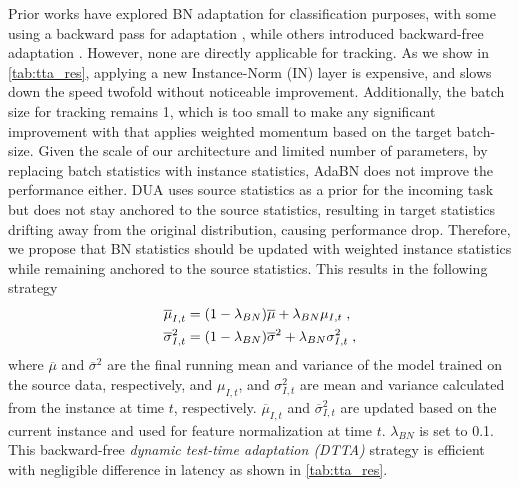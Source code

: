 Prior works have explored BN adaptation for classification purposes, with some using a backward pass for adaptation \cite{niu2022efficient, wang2020tent}, while others introduced backward-free adaptation \cite{pan2018two, schneider2020improving, mirza2022norm, li2016revisiting}. However, none are directly applicable for tracking. As we show in \ref{tab:tta_res}, applying a new Instance-Norm (IN) layer \cite{pan2018two} is expensive, and slows down the speed twofold without noticeable improvement. Additionally, the batch size for tracking remains 1, which is too small to make any significant improvement with \cite{schneider2020improving} that applies weighted momentum based on the target batch-size. Given the scale of our architecture and limited number of parameters, by replacing batch statistics with instance statistics, AdaBN \cite{li2016revisiting} does not improve the performance either. DUA \cite{mirza2022norm} uses source statistics as a prior for the incoming task but does not stay anchored to the source statistics, resulting in target statistics drifting away from the original distribution, causing performance drop. Therefore, we propose that BN statistics should be updated with weighted instance statistics while remaining anchored to the source statistics. This results in the following strategy
\begin{equation}
  \centering
  \label{eq:bn_update}
      \begin{aligned}  
          \overline{\mu}_{I,t} &= (1-\lambda{_{BN}}) \overline{\mu} +  \lambda{_{BN}} \mu_{I,t} \; ,\\
          \overline{\sigma}_{I,t}^2 &= (1-\lambda{_{BN}}) \overline{\sigma}^2 +  \lambda{_{BN}} \sigma_{I,t}^2 \; ,
      \end{aligned}
\end{equation}
where $\overline{\mu}$ and $\overline{\sigma}^2$ are the final running mean and variance of the model trained on the source data, respectively, and $\mu_{I,t}$, and $\sigma_{I,t}^2$ are mean and variance calculated from the instance at time $t$, respectively. $\overline{\mu}_{I,t}$ and $\overline{\sigma}_{I,t}^2$ are updated based on the current instance and used for feature normalization at time $t$. $ \lambda{_{BN}}$ is set to 0.1. This backward-free \emph{dynamic test-time adaptation (DTTA)} strategy is efficient with negligible difference in latency as shown in \ref{tab:tta_res}.


